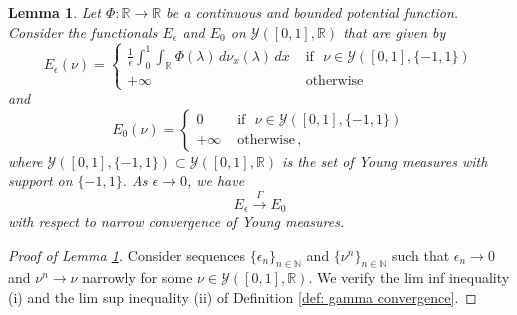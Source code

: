 \documentclass[11pt]{amsart}
\newtheorem{lemma}{Lemma}[section]
\def\R{\mathbb{R}}
\def\N{\mathbb{N}}
\def\ep{\epsilon}
\def\ra{\rightarrow}
\def\gamra{\stackrel{\Gamma}{\longrightarrow}}
\numberwithin{equation}{section}
\begin{document}
{\begin{lemma} \label{lemma: double-well gamma convergence}
    Let $\Phi: \R \ra \R$ be a continuous and bounded potential function. Consider the functionals $E_\ep$ and $E_0$ on $\mathcal{Y}([0,1],\R)$ that are given by
    \begin{equation}\label{graphon double well}
 	   E_\ep(\nu) = 
        \begin{cases}
        \displaystyle
            \frac{1}{\ep} \int_0^1 \int_\R \Phi(\lambda)\,d\nu_x(\lambda) \, dx &\text{ if } \,\, {\nu \in \mathcal{Y}([0,1],\{-1,1\})} \\
        + \infty & {\text{ otherwise}}
        \end{cases}
    \end{equation}	   
    and
    \begin{equation}
    E_0(\nu) = 
        \begin{cases}
        0 &\text{ if } \,\, {\nu \in \mathcal{Y}([0,1],\{-1,1\})} \\
        + \infty &\text{ otherwise}\,, 
        \end{cases}
    \end{equation}
where $\mathcal{Y}([0,1],\{-1,1\}) \subset \mathcal{Y}([0,1],\R)$ is the set of Young measures with support on $\{-1,1\}$. As $\ep \ra 0$, we have
\begin{equation}
        E_\ep \gamra E_0 
    \label{eq: double-well gamma convergence}
\end{equation}      
    with respect to narrow convergence of {Young measures}. 
\end{lemma}


\begin{proof}[Proof of Lemma \ref{lemma: double-well gamma convergence}]
    Consider sequences $\{\ep_n\}_{n\in \N}$ and $\{\nu^n\}_{n\in \N}$ such that $\ep_n \ra 0$ and $\nu^n \ra \nu$ narrowly for some $\nu \in \mathcal{Y}([0,1],{\mathbb{R}})$. We verify the {lim inf} inequality (i) and the {lim sup} inequality (ii) of Definition \ref{def: gamma convergence}.
     


\end{proof}}
\end{document}
